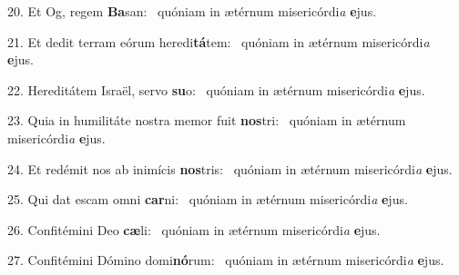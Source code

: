 20. Et Og, regem \textbf{Ba}san: \ast\  quóniam in ætérnum misericórdi\textit{a} \textbf{e}jus.\

21. Et dedit terram eórum heredi\textbf{tá}tem: \ast\  quóniam in ætérnum misericórdi\textit{a} \textbf{e}jus.\

22. Hereditátem Israël, servo \textbf{su}o: \ast\  quóniam in ætérnum misericórdi\textit{a} \textbf{e}jus.\

23. Quia in humilitáte nostra memor fuit \textbf{nos}tri: \ast\  quóniam in ætérnum misericórdi\textit{a} \textbf{e}jus.\

24. Et redémit nos ab inimícis \textbf{nos}tris: \ast\  quóniam in ætérnum misericórdi\textit{a} \textbf{e}jus.\

25. Qui dat escam omni \textbf{car}ni: \ast\  quóniam in ætérnum misericórdi\textit{a} \textbf{e}jus.\

26. Confitémini Deo \textbf{cæ}li: \ast\  quóniam in ætérnum misericórdi\textit{a} \textbf{e}jus.\

27. Confitémini Dómino domi\textbf{nó}rum: \ast\  quóniam in ætérnum misericórdi\textit{a} \textbf{e}jus.\

